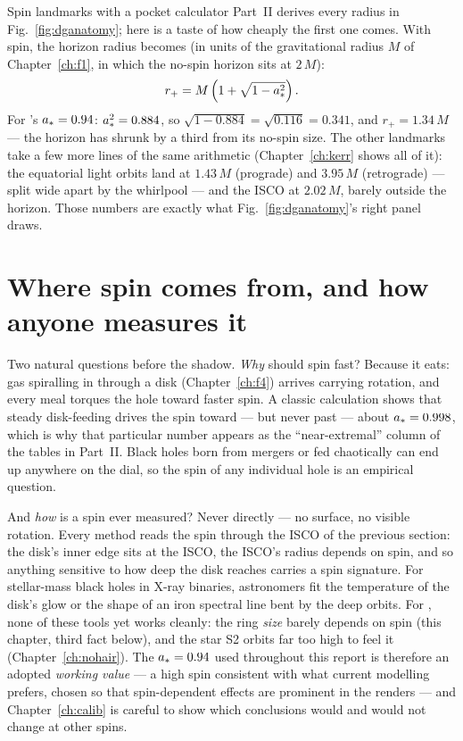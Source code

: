 \begin{worked}{Spin landmarks with a pocket calculator}
Part~II derives every radius in Fig.~\ref{fig:dganatomy}; here is a
taste of how cheaply the first one comes. With spin, the horizon radius
becomes (in units of the gravitational radius $M$ of
Chapter~\ref{ch:f1}, in which the no-spin horizon sits at $2\,M$):
\[
r_+ = M\left(1+\sqrt{1-a_*^2}\right).
\]
For \sgra{}'s $a_* = 0.94$: $a_*^2 = 0.884$, so
$\sqrt{1-0.884} = \sqrt{0.116} = 0.341$, and $r_+ = 1.34\,M$ — the
horizon has shrunk by a third from its no-spin size. The other
landmarks take a few more lines of the same arithmetic
(Chapter~\ref{ch:kerr} shows all of it): the equatorial light orbits
land at $1.43\,M$ (prograde) and $3.95\,M$ (retrograde) — split wide
apart by the whirlpool — and the ISCO at $2.02\,M$, barely outside the
horizon. Those numbers are exactly what Fig.~\ref{fig:dganatomy}'s
right panel draws.
\end{worked}

\section{Where spin comes from, and how anyone measures it}

Two natural questions before the shadow. \emph{Why} should \sgra{}
spin fast? Because it eats: gas spiralling in through a disk
(Chapter~\ref{ch:f4}) arrives carrying rotation, and every meal
torques the hole toward faster spin. A classic calculation shows that
steady disk-feeding drives the spin toward — but never past — about
$a_* = 0.998$, which is why that particular number appears as the
``near-extremal'' column of the tables in Part~II. Black holes born
from mergers or fed chaotically can end up anywhere on the dial, so
the spin of any individual hole is an empirical question.

And \emph{how} is a spin ever measured? Never directly — no surface,
no visible rotation. Every method reads the spin through the ISCO of
the previous section: the disk's inner edge sits at the ISCO, the
ISCO's radius depends on spin, and so anything sensitive to how deep
the disk reaches carries a spin signature. For stellar-mass black
holes in X-ray binaries, astronomers fit the temperature of the
disk's glow or the shape of an iron spectral line bent by the deep
orbits. For \sgra{}, none of these tools yet works cleanly: the ring
\emph{size} barely depends on spin (this chapter, third fact below),
and the star S2 orbits far too high to feel it
(Chapter~\ref{ch:nohair}). The $a_* = 0.94$ used throughout this
report is therefore an adopted \emph{working value} — a high spin
consistent with what current modelling prefers, chosen so that
spin-dependent effects are prominent in the renders — and
Chapter~\ref{ch:calib} is careful to show which conclusions would and
would not change at other spins.

